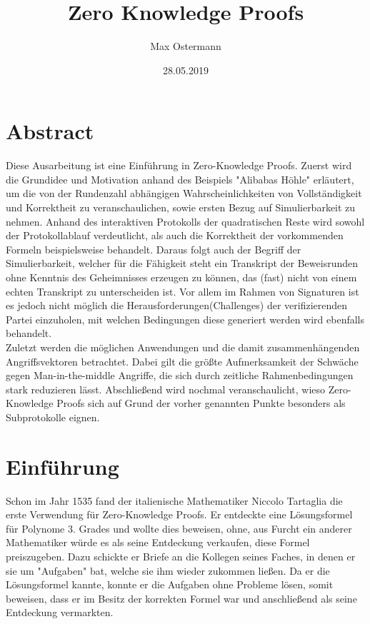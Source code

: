 \documentclass {article}
\title{Zero Knowledge Proofs}
\author{Max Ostermann}
\date{28.05.2019}
\begin{document}
\maketitle
{}
\newpage
{}

\section{Abstract}
Diese Ausarbeitung ist eine Einführung in Zero-Knowledge Proofs.
Zuerst wird die Grundidee und Motivation anhand des Beispiels "Alibabas H\"ohle" erl\"autert, um die von der Rundenzahl abh\"angigen Wahrscheinlichkeiten von Vollst\"andigkeit und Korrektheit zu veranschaulichen, sowie ersten Bezug auf Simulierbarkeit zu nehmen. Anhand des interaktiven Protokolls der quadratischen Reste wird sowohl der Protokollablauf verdeutlicht, als auch die Korrektheit der vorkommenden Formeln beispielsweise behandelt. Daraus folgt auch der Begriff der Simulierbarkeit, welcher für die F\"ahigkeit steht ein Transkript der Beweisrunden ohne Kenntnis des Geheimnisses erzeugen zu können, das (fast) nicht von einem echten Transkript zu unterscheiden ist. Vor allem im Rahmen von Signaturen ist es jedoch nicht m\"oglich die Herausforderungen(Challenges) der verifizierenden Partei einzuholen, mit welchen Bedingungen diese generiert werden wird ebenfalls behandelt. \\ 
Zuletzt werden die m\"oglichen Anwendungen und die damit zusammenh\"angenden Angriffsvektoren betrachtet. Dabei gilt die gr\"oßte Aufmerksamkeit der Schw\"ache gegen Man-in-the-middle Angriffe, die sich durch zeitliche Rahmenbedingungen stark reduzieren l\"asst. Abschlie\ss{}end wird nochmal veranschaulicht, wieso Zero-Knowledge Proofs sich auf Grund der vorher genannten Punkte besonders als Subprotokolle eignen.


\newpage

\tableofcontents

\newpage 

\section{Einf\"uhrung}

Schon im Jahr 1535 fand der italienische Mathematiker Niccolo Tartaglia die erste Verwendung für Zero-Knowledge Proofs. Er entdeckte eine Lösungsformel für Polynome 3. Grades und wollte dies beweisen, ohne, aus Furcht ein anderer Mathematiker würde es als seine Entdeckung verkaufen, diese Formel preiszugeben. Dazu schickte er Briefe an die Kollegen seines Faches, in denen er sie um "Aufgaben" bat, welche sie ihm wieder zukommen lie\ss{}en. Da er die Lösungsformel kannte, konnte er die Aufgaben ohne Probleme lösen, somit beweisen, dass er im Besitz der korrekten Formel war und anschlie\ss{}end als seine Entdeckung vermarkten. \\
\end{document}
